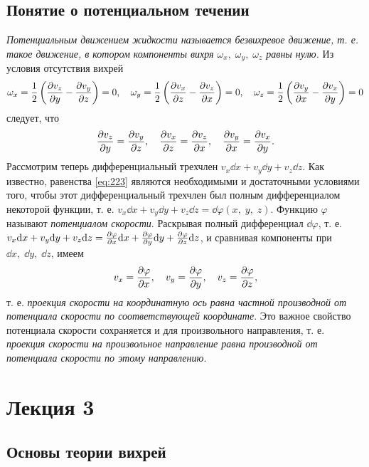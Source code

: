 	\subsection{Понятие о потенциальном течении}
	\textit{Потенциальным движением жидкости называется безвихревое движение, т. е. такое движение, в котором компоненты вихря $\omega_x,\; \omega_y,\; \omega_z$ равны нулю.} Из условия отсутствия вихрей
	\begin{gather*}
		\omega_x = \frac{1}{2}\left(\frac{\partial v_z}{\partial y} - \frac{\partial v_y}{\partial z}\right) = 0,\quad
		\omega_y = \frac{1}{2}\left(\frac{\partial v_x}{\partial z} - \frac{\partial v_z}{\partial x}\right) = 0,\quad
		\omega_z = \frac{1}{2}\left(\frac{\partial v_y}{\partial x} - \frac{\partial v_x}{\partial y}\right) = 0
	\end{gather*}
	следует, что
	\begin{gather}\label{eq:223}
		\frac{\partial v_z}{\partial y} = \frac{\partial v_y}{\partial z},\quad
		\frac{\partial v_x}{\partial z} = \frac{\partial v_z}{\partial x},\quad
		\frac{\partial v_y}{\partial x} = \frac{\partial v_x}{\partial y}.
	\end{gather}\n
	Рассмотрим теперь дифференциальный трехчлен $v_x\dd x + v_y\dd y + v_z\dd z$. Как известно, равенства \eqref{eq:223} являются необходимыми и достаточными условиями того, чтобы этот дифференциальный трехчлен был полным дифференциалом некоторой функции, т. е. $v_x\dd x + v_y\dd y + v_z\dd z = \dd\varphi\left(x,\; y,\; z\right)$.\n
	Функцию $\varphi$ называют \textit{потенциалом скорости}. Раскрывая полный дифференциал $\dd\varphi$, т. е. $v_x\mathrm{d} x + v_y\mathrm{d} y + v_z\mathrm{d} z = \frac{\partial\varphi}{\partial x}\mathrm{d} x + \frac{\partial\varphi}{\partial y}\mathrm{d} y + \frac{\partial\varphi}{\partial z}\mathrm{d} z$, и сравнивая компоненты при $\dd x,\; \dd y,\; \dd z$, имеем
	\begin{gather}\label{eq:224}
		v_x = \frac{\partial\varphi}{\partial x},\quad
		v_y = \frac{\partial\varphi}{\partial y},\quad
		v_z = \frac{\partial\varphi}{\partial z},
	\end{gather}
	т. е. \textit{проекция скорости на координатную ось равна частной производной от потенциала скорости по соответствующей координате}.\n
	Это важное свойство потенциала скорости сохраняется и для произвольного направления, т. е. \textit{проекция скорости на произвольное направление равна производной от потенциала скорости по этому направлению}.
	
	\newpage
	\section{Лекция 3}
	
	\subsection{Основы теории вихрей}
	
